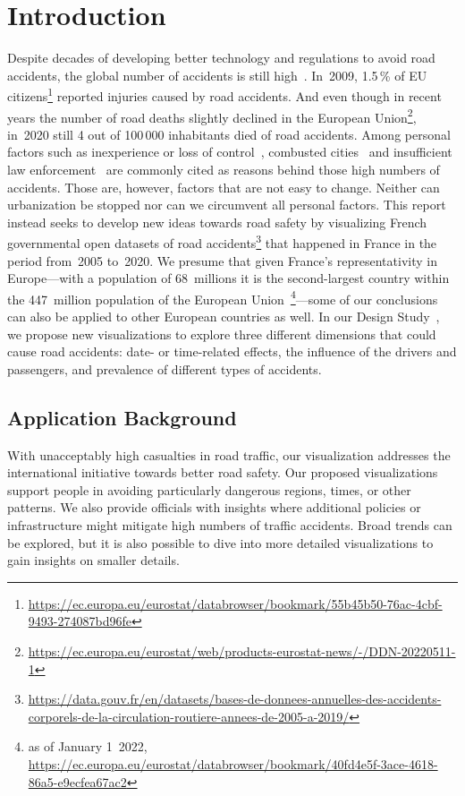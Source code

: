 \section{Introduction}
\label{introduction}
Despite decades of developing better technology and regulations to avoid road accidents, the global number of accidents is still high~\cite{Who2015}. In~2009, 1.5\,\% of EU citizens\footnote{\url{https://ec.europa.eu/eurostat/databrowser/bookmark/55b45b50-76ac-4cbf-9493-274087bd96fe}} reported injuries caused by road accidents. And even though in recent years the number of road deaths slightly declined in the European Union\footnote{\url{https://ec.europa.eu/eurostat/web/products-eurostat-news/-/DDN-20220511-1}}, in~2020 still 4 out of 100\,000 inhabitants died of road accidents. Among personal factors such as inexperience or loss of control~\cite{RolisonRMF2018}, combusted cities~\cite{AlbalateF2021} and insufficient law enforcement~\cite{Who2015} are commonly cited as reasons behind those high numbers of accidents. Those are, however, factors that are not easy to change. Neither can urbanization be stopped nor can we circumvent all personal factors. This report instead seeks to develop new ideas towards road safety by visualizing French governmental open datasets of road accidents\footnote{\url{https://data.gouv.fr/en/datasets/bases-de-donnees-annuelles-des-accidents-corporels-de-la-circulation-routiere-annees-de-2005-a-2019/}} that happened in France in the period from~2005 to~2020. We presume that given France's representativity in Europe---with a population of 68~millions it is the second-largest country within the 447~million population of the European Union~\footnote{as of January 1\ 2022, \url{https://ec.europa.eu/eurostat/databrowser/bookmark/40fd4e5f-3ace-4618-86a5-e9ecfea67ac2}}---some of our conclusions can also be applied to other European countries as well. In our Design Study~\cite{Munzner2008}, we propose new visualizations to explore three different dimensions that could cause road accidents: \Ni date- or time-related effects, \Nii the influence of the drivers and passengers, and \Niii prevalence of different types of accidents.

\subsection{Application Background}
With unacceptably high casualties in road traffic, our visualization addresses the international initiative towards better road safety. Our proposed visualizations support people in avoiding particularly dangerous regions, times, or other patterns. We also provide officials with insights where additional policies or infrastructure might mitigate high numbers of traffic accidents. Broad trends can be explored, but it is also possible to dive into more detailed visualizations to gain insights on smaller details.

